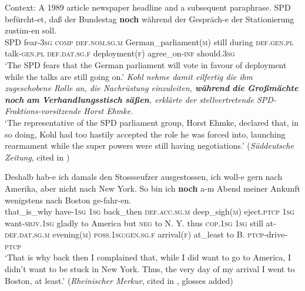\begin{exe}
\ex\label{appendixGermanContinuativeTT1}
	 Context: A 1989 article newspaper headline and a subsequent paraphrase.
		\exi{}\gll SPD befürcht-et, daß der Bundestag \textbf{noch} während der Gespräch-e der Stationierung zustim-en soll.\\
		SPD fear-3\textsc{sg} \textsc{comp} \textsc{def}.\textsc{nom}.\textsc{sg}.\textsc{m} German\_parliament(\textsc{m}) still during \textsc{def}.\textsc{gen}.\textsc{pl} talk-\textsc{gen}.\textsc{pl} \textsc{def}.\textsc{dat}.\textsc{sg}.\textsc{f} deployment(\textsc{f}) agree\_on-\textsc{inf} should.3\textsc{sg} \\
	\glt \lq The SPD fears that the German parliament will vote in favour of deployment while the talks are still going on.'
			\exi{}\textit{Kohl nehme damit eilfertig die ihm zugeschobene Rolle an, die Nachrüstung einzuleiten, \textbf{während}  \textbf{die}  \textbf{Großmächte}  \textbf{noch} \textbf{am}  \textbf{Verhandlungsstisch}  \textbf{säßen}, erklärte der stellvertretende SPD-Fraktions-vorsitzende Horst Ehmke}.\\
 \lq The representative of the SPD parliament group, Horst Ehmke, declared that, in so doing, Kohl had too hastily accepted the role he was forced into, launching rearmament while the super powers were still having negotiations.' (\textit{Süddeutsche Zeitung}, cited in \cite[211, fn 12]{Loebner1989})

\ex\label{appendixGermanContinuativeTT2}
\gll Deshalb hab-e ich damals den Stossseufzer ausgestossen, ich woll-e gern nach Amerika, aber nicht nach New York. So bin ich \textbf{noch} a-m Abend meiner  Ankunft wenigstens nach Boston ge-fahr-en.\\
that\_is\_why have-1\textsc{sg} 1\textsc{sg} back\_then \textsc{def}.\textsc{acc}.\textsc{sg}.\textsc{m} deep\_sigh(\textsc{m})
eject.\textsc{ptcp} 1\textsc{sg} want-\textsc{sbjv}.1\textsc{sg} gladly to America but \textsc{neg} to N. Y. thus \textsc{cop}.1\textsc{sg} 1\textsc{sg} still at-\textsc{def}.\textsc{dat}.\textsc{sg}.\textsc{m} evening(\textsc{m}) \textsc{poss}.1\textsc{sg}:\textsc{gen}.\textsc{sg}.\textsc{f} arrival(\textsc{f}) at\_least to B. \textsc{ptcp}-drive-\textsc{ptcp}\\
\glt \lq That is why back then I complained that, while I did want to go to America, I didn't want to be stuck in New York. Thus, the very day of my arrival I went to Boston, at least.' (\textit{Rheinischer Merkur}, cited in \cite[57]{Shetter1966}, glosses added)


\end{exe}
